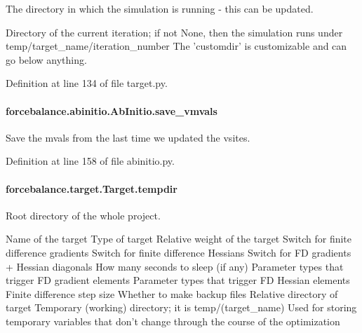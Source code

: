The directory in which the simulation is running -\/ this can be updated. 

Directory of the current iteration; if not None, then the simulation runs under temp/target\-\_\-name/iteration\-\_\-number The 'customdir' is customizable and can go below anything.

Definition at line 134 of file target.\-py.

\hypertarget{classforcebalance_1_1abinitio_1_1AbInitio_a22037bf43728fa45f387390005e0b131}{
\paragraph[{save\-\_\-vmvals}]{\setlength{\rightskip}{0pt plus 5cm}forcebalance.\-abinitio.\-Ab\-Initio.\-save\-\_\-vmvals\hspace{0.3cm}{\ttfamily [inherited]}}}\label{classforcebalance_1_1abinitio_1_1AbInitio_a22037bf43728fa45f387390005e0b131}


Save the mvals from the last time we updated the vsites. 



Definition at line 158 of file abinitio.\-py.

\hypertarget{classforcebalance_1_1target_1_1Target_aa1f01b5b78db253b5b66384ed11ed193}{
\paragraph[{tempdir}]{\setlength{\rightskip}{0pt plus 5cm}forcebalance.\-target.\-Target.\-tempdir\hspace{0.3cm}{\ttfamily [inherited]}}}\label{classforcebalance_1_1target_1_1Target_aa1f01b5b78db253b5b66384ed11ed193}


Root directory of the whole project. 

Name of the target Type of target Relative weight of the target Switch for finite difference gradients Switch for finite difference Hessians Switch for F\-D gradients + Hessian diagonals How many seconds to sleep (if any) Parameter types that trigger F\-D gradient elements Parameter types that trigger F\-D Hessian elements Finite difference step size Whether to make backup files Relative directory of target Temporary (working) directory; it is temp/(target\-\_\-name) Used for storing temporary variables that don't change through the course of the optimization 

